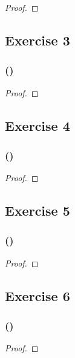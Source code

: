\documentclass[14pt]{extarticle}
\begin{document}
\begin{proof}

\end{proof}

\subsection{Exercise 3}

\subsubsection{()}

\begin{proof}

\end{proof}

\subsection{Exercise 4}

\subsubsection{()}

\begin{proof}

\end{proof}

\subsection{Exercise 5}

\subsubsection{()}

\begin{proof}

\end{proof}

\subsection{Exercise 6}

\subsubsection{()}

\begin{proof}

\end{proof}
\end{document}
